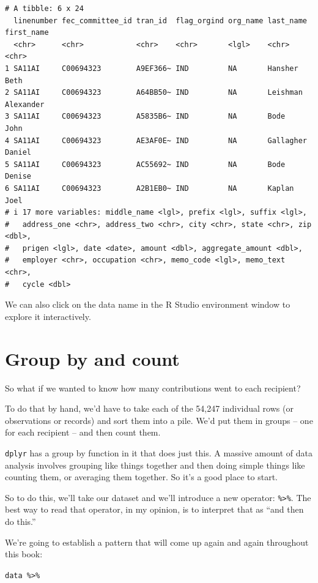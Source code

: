 \documentclass[
  letterpaper,
  DIV=11,
  numbers=noendperiod]{scrreprt}
\begin{document}
\begin{verbatim}
# A tibble: 6 x 24
  linenumber fec_committee_id tran_id  flag_orgind org_name last_name first_name
  <chr>      <chr>            <chr>    <chr>       <lgl>    <chr>     <chr>     
1 SA11AI     C00694323        A9EF366~ IND         NA       Hansher   Beth      
2 SA11AI     C00694323        A64BB50~ IND         NA       Leishman  Alexander 
3 SA11AI     C00694323        A5835B6~ IND         NA       Bode      John      
4 SA11AI     C00694323        AE3AF0E~ IND         NA       Gallagher Daniel    
5 SA11AI     C00694323        AC55692~ IND         NA       Bode      Denise    
6 SA11AI     C00694323        A2B1EB0~ IND         NA       Kaplan    Joel      
# i 17 more variables: middle_name <lgl>, prefix <lgl>, suffix <lgl>,
#   address_one <chr>, address_two <chr>, city <chr>, state <chr>, zip <dbl>,
#   prigen <lgl>, date <date>, amount <dbl>, aggregate_amount <dbl>,
#   employer <chr>, occupation <chr>, memo_code <lgl>, memo_text <chr>,
#   cycle <dbl>
\end{verbatim}

We can also click on the data name in the R Studio environment window to
explore it interactively.

\hypertarget{group-by-and-count}{%
\section{Group by and count}\label{group-by-and-count}}

So what if we wanted to know how many contributions went to each
recipient?

To do that by hand, we'd have to take each of the 54,247 individual rows
(or observations or records) and sort them into a pile. We'd put them in
groups -- one for each recipient -- and then count them.

\texttt{dplyr} has a group by function in it that does just this. A
massive amount of data analysis involves grouping like things together
and then doing simple things like counting them, or averaging them
together. So it's a good place to start.

So to do this, we'll take our dataset and we'll introduce a new
operator: \texttt{\%\textgreater{}\%}. The best way to read that
operator, in my opinion, is to interpret that as ``and then do this.''

We're going to establish a pattern that will come up again and again
throughout this book:

\texttt{data\ \%\textgreater{}\%}
\end{document}
